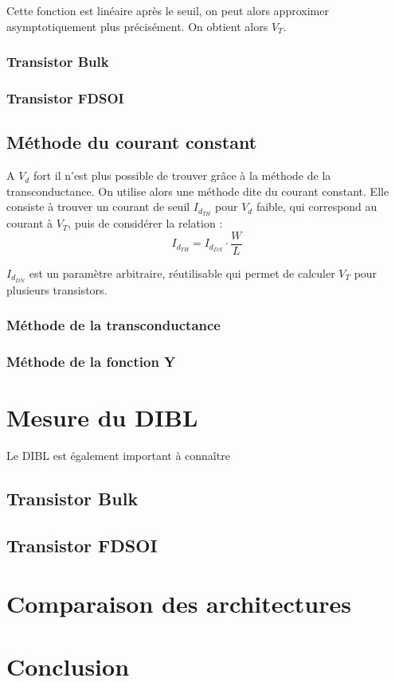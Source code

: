\documentclass[a4paper,11pt]{report}
\begin{document}
Cette fonction est linéaire après le seuil, on peut alors approximer asymptotiquement plus précisément. On obtient alors $V_T$.
\subsection{Transistor Bulk}
\subsection{Transistor FDSOI}
\section{Méthode du courant constant}
A $V_d$ fort il n'est plus possible de trouver grâce à la méthode de la transconductance. On utilise alors une méthode dite du courant constant. Elle consiste à trouver un courant de seuil $I_{d_{TH}}$ pour $V_d$ faible, qui correspond au courant à $V_T$, puis de considérer la relation : \[I_{d_{TH}}=I_{d_{DN}}\cdot\dfrac{W}{L}\]

$I_{d_{DN}}$ est un paramètre arbitraire, réutilisable qui permet de calculer $V_T$ pour plusieurs transistors.


\subsection{Méthode de la transconductance}


\subsection{Méthode de la fonction Y}

\chapter{Mesure du DIBL}
Le DIBL est également important à connaître %
\section{Transistor Bulk}

\section{Transistor FDSOI}

\chapter{Comparaison des architectures}

\chapter*{Conclusion}
\end{document}
